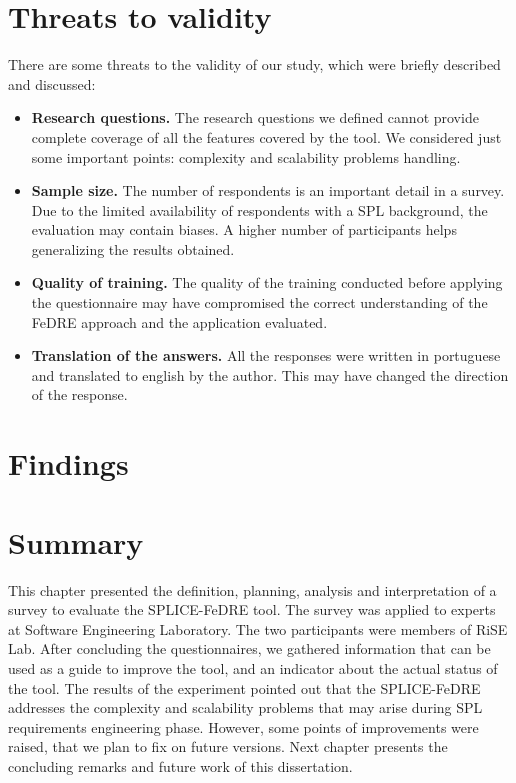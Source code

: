 \section{Threats to validity}
\label{sc:threats}
There are some threats to the validity of our study, which were briefly
described and discussed:
\begin{itemize}
\item \textbf{Research questions.} The research questions we defined cannot
provide complete coverage of all the features covered by the tool. We considered just some important points: complexity and 
scalability problems handling.

\item \textbf{Sample size.} The number of respondents is an important detail in
a survey. Due to the limited availability of respondents with a \ac{SPL} background, the evaluation
may contain biases.
A higher number of participants helps  generalizing the results obtained.

\item \textbf{Quality of training.} The quality of the training conducted before
applying the questionnaire may have compromised the correct understanding of the \ac{FeDRE} approach and 
the application evaluated.

\item \textbf{Translation of the answers.} All the responses were written in
portuguese and translated to english by the author. This may have changed the direction of the response.

\end{itemize}

\section{Findings}
\label{sc:leassonsLearned}

\section{Summary}
\label{sc:expsummary}

This chapter presented the definition, planning, analysis and interpretation of a survey 
to evaluate the SPLICE-FeDRE tool. The survey was applied to experts at Software Engineering Laboratory. 
The two participants were members of \ac{RiSE} Lab. After concluding the  
questionnaires, we gathered information that can be used as a guide to improve the tool, and an indicator 
about the actual status of the tool. 
The results of the experiment pointed out that the SPLICE-FeDRE addresses the 
complexity and scalability problems that may arise during \ac{SPL} requirements
engineering phase.
However, some points of improvements were raised, that we plan to fix on future versions. Next 
chapter presents the concluding remarks and future work of this dissertation.


